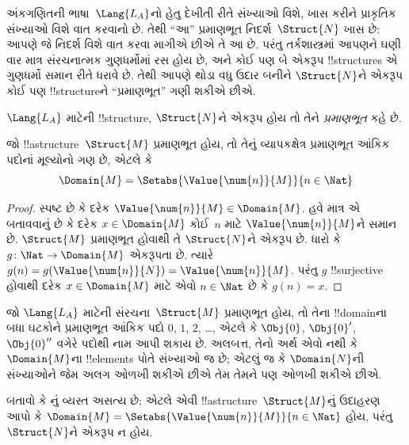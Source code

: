 \documentclass[../../../include/open-logic-section]{subfiles}
\begin{document}

અંકગણિતની ભાષા~$\Lang{L_A}$નો હેતુ દેખીતી રીતે સંખ્યાઓ વિશે,
ખાસ કરીને પ્રાકૃતિક સંખ્યાઓ વિશે વાત કરવાનો છે. તેથી ``આ'' પ્રમાણભૂત
નિદર્શ~$\Struct{N}$ ખાસ છે: આપણે જે નિદર્શ વિશે વાત કરવા માગીએ છીએ
તે આ છે. પરંતુ તર્કશાસ્ત્રમાં આપણને ઘણી વાર માત્ર સંરચનાત્મક
ગુણધર્મોમાં રસ હોય છે, અને કોઈ પણ બે એકરૂપ !!{structure}s એ ગુણધર્મો
સમાન રીતે ધરાવે છે. તેથી આપણે થોડા વધુ ઉદાર બનીને $\Struct{N}$ને
એકરૂપ કોઈ પણ !!{structure}ને ``પ્રમાણભૂત'' ગણી શકીએ છીએ.

\begin{defn}
$\Lang{L_A}$ માટેની !!{structure}, $\Struct{N}$ને એકરૂપ હોય તો તેને
\emph{પ્રમાણભૂત} કહે છે.
\end{defn}

\begin{prop}
 જો !!a{structure}~$\Struct{M}$
પ્રમાણભૂત હોય, તો તેનું વ્યાપકક્ષેત્ર પ્રમાણભૂત આંકિક પદોનાં મૂલ્યોનો
ગણ છે, એટલે કે
\[
\Domain{M} = \Setabs{\Value{\num{n}}{M}}{n \in \Nat}
\]
\end{prop}

\begin{proof}
સ્પષ્ટ છે કે દરેક $\Value{\num{n}}{M}\in\Domain{M}$. હવે માત્ર એ
બતાવવાનું છે કે દરેક $x\in\Domain{M}$ કોઈ~$n$ માટે
$\Value{\num{n}}{M}$ને સમાન છે. $\Struct{M}$ પ્રમાણભૂત હોવાથી તે
$\Struct{N}$ને એકરૂપ છે. ધારો કે $g\colon\Nat\to\Domain{M}$ એકરૂપતા
છે. ત્યારે
$g(n)=g(\Value{\num{n}}{N})=\Value{\num{n}}{M}$. પરંતુ $g$
!!{surjective} હોવાથી દરેક $x\in\Domain{M}$ માટે એવો $n\in\Nat$ છે
કે $g(n)=x$.
\end{proof}

\begin{explain}
જો $\Lang{L_A}$ માટેની સંરચના~$\Struct{M}$ પ્રમાણભૂત હોય, તો તેના
!!{domain}ના બધા ઘટકોને પ્રમાણભૂત આંકિક પદો $\num{0}$, $\num{1}$,
$\num{2}$, \dots, એટલે કે $\Obj{0}$, $\Obj{0}'$, $\Obj{0}''$ વગેરે
પદોથી નામ આપી શકાય છે. અલબત્ત, તેનો અર્થ એવો નથી કે
$\Domain{M}$ના !!{element}s પોતે સંખ્યાઓ જ છે; એટલું જ કે
$\Domain{N}$ની સંખ્યાઓને જેમ અલગ ઓળખી શકીએ છીએ તેમ તેમને પણ ઓળખી
શકીએ છીએ.
\end{explain}

\begin{prob}
બતાવો કે નું વ્યસ્ત અસત્ય છે;
એટલે એવી !!a{structure}~$\Struct{M}$નું ઉદાહરણ આપો કે
$\Domain{M}=\Setabs{\Value{\num{n}}{M}}{n\in\Nat}$ હોય, પરંતુ
$\Struct{N}$ને એકરૂપ ન હોય.
\end{prob}
\end{document}
